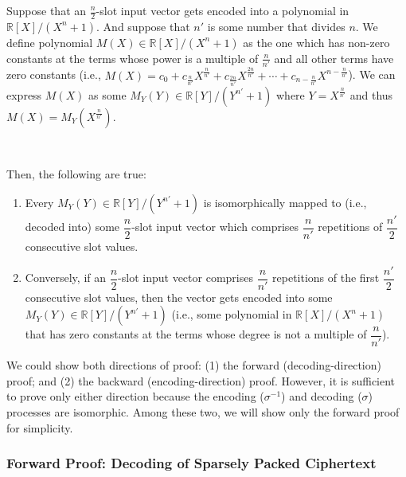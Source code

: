 \begin{tcolorbox}[title={\textbf{\tboxlabel{\ref*{subsec:ckks-sparse-packing}} CKKS's Sparsely Packing Polynomial and Ciphertext}}]

Suppose that an $\frac{n}{2}$-slot input vector gets encoded into a polynomial in $\mathbb{R}[X] / (X^n + 1)$. And suppose that $n'$ is some number that divides $n$. We define polynomial $M(X) \in \mathbb{R}[X] / (X^n + 1)$ as the one which has non-zero constants at the terms whose power is a multiple of $\frac{n}{n'}$ and all other terms have zero constants (i.e., $M(X) = c_0 + c_{\frac{n}{n'}}X^{\frac{n}{n'}} + c_{\frac{2n}{n'}}X^{\frac{2n}{n'}} + \cdots + c_{n - \frac{n}{n'}}X^{n - \frac{n}{n'}}$). We can express $M(X)$ as some $M_Y(Y) \in \mathbb{R}[Y] / (Y^{n'} + 1)$ where $Y = X^{\frac{n}{n'}}$ and thus $M(X) = M_Y(X^{\frac{n}{n'}})$. 

$ $

Then, the following are true:

\begin{enumerate}
    \item Every $M_Y(Y) \in \mathbb{R}[Y]/(Y^{n'} + 1)$ is isomorphically mapped to (i.e., decoded into) some $\dfrac{n}{2}$-slot input vector which comprises $\dfrac{n}{n'}$ repetitions of $\dfrac{n'}{2}$ consecutive slot values.
    \item Conversely, if an $\dfrac{n}{2}$-slot input vector comprises $\dfrac{n}{n'}$ repetitions of the first $\dfrac{n'}{2}$ consecutive slot values, then the vector gets encoded into some $M_Y(Y) \in \mathbb{R}[Y] / (Y^{n'} + 1)$ (i.e., some polynomial in $\mathbb{R}[X] / (X^n + 1)$ that has zero constants at the terms whose degree is not a multiple of $\dfrac{n}{n'}$). 
\end{enumerate}

\end{tcolorbox}

We could show both directions of proof: (1) the forward (decoding-direction) proof; and (2) the backward (encoding-direction) proof. However, it is sufficient to prove only either direction because the encoding ($\sigma^{-1}$) and decoding ($\sigma$) processes are isomorphic. Among these two, we will show only the forward proof for simplicity. 

\subsubsection{Forward Proof: Decoding of Sparsely Packed Ciphertext}

